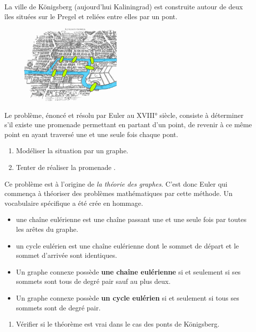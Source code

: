 \documentclass[a4paper,11pt]{article}
\begin{document}
\begin{exo}
    La ville de Königsberg (aujourd'hui Kaliningrad) est construite autour de deux îles situées sur le Pregel et reliées entre elles par un pont.
    \begin{figure}[!h]
    \centering
    \includegraphics[width=5cm]{ressources/pont-konisberg.png}
    \label{pont}
    \end{figure}
    
    Le problème, énoncé et résolu par Euler au XVIII° siècle, consiste à déterminer s'il existe une promenade permettant en partant d'un point, de revenir à ce même point en ayant traversé une et une seule fois chaque pont.
    \begin{enumerate}
    \item Modéliser la situation par un graphe.
    \item Tenter de réaliser la promenade .
    \end{enumerate}
    Ce problème est à l'origine de \emph{la théorie des graphes}. C'est donc Euler qui commença à théoriser des problèmes mathématiques par cette méthode. Un vocabulaire spécifique a été crée en hommage.
        \begin{aretenir}[Rappel]
            \begin{itemize}
                \item une chaîne eulérienne est une chaîne passant une et une seule fois par toutes les arêtes du graphe.
                \item un cycle eulérien est une chaîne eulérienne dont le sommet de départ et le sommet d'arrivée sont identiques. 
                \end{itemize} 
        \end{aretenir}
        \begin{aretenir}[Théorème]
            \begin{itemize}
                \item Un graphe connexe possède \textbf{une chaîne eulérienne} si et seulement si ses sommets sont tous de degré pair sauf au plus deux.
                \item Un graphe connexe possède \textbf{un cycle eulérien} si et seulement si tous ses sommets sont de degré pair. 
                \end{itemize}
        \end{aretenir}
    \begin{enumerate}[resume]
    \item Vérifier si le théorème est vrai dans le cas des ponts de Königsberg.
    \end{enumerate}
    \end{exo}
\end{document}
